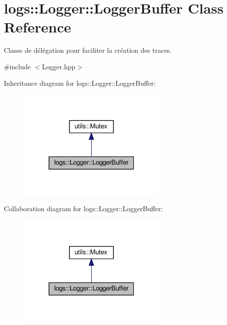 \hypertarget{classlogs_1_1Logger_1_1LoggerBuffer}{}\section{logs\+:\+:Logger\+:\+:Logger\+Buffer Class Reference}
\label{classlogs_1_1Logger_1_1LoggerBuffer}


Classe de délégation pour faciliter la création des traces.  




{\ttfamily \#include $<$Logger.\+hpp$>$}



Inheritance diagram for logs\+:\+:Logger\+:\+:Logger\+Buffer\+:
\nopagebreak
\begin{figure}[H]
\begin{center}
\leavevmode
\includegraphics[width=211pt]{classlogs_1_1Logger_1_1LoggerBuffer__inherit__graph}
\end{center}
\end{figure}


Collaboration diagram for logs\+:\+:Logger\+:\+:Logger\+Buffer\+:
\nopagebreak
\begin{figure}[H]
\begin{center}
\leavevmode
\includegraphics[width=211pt]{classlogs_1_1Logger_1_1LoggerBuffer__coll__graph}
\end{center}
\end{figure}
